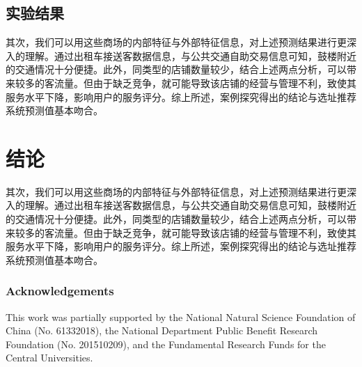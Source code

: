 \documentclass{llncs}
\begin{document}
\subsection{实验结果}
其次，我们可以用这些商场的内部特征与外部特征信息，对上述预测结果进行更深入的理解。通过出租车接送客数据信息，与公共交通自助交易信息可知，鼓楼附近的交通情况十分便捷。此外，同类型的店铺数量较少，结合上述两点分析，可以带来较多的客流量。但由于缺乏竞争，就可能导致该店铺的经营与管理不利，致使其服务水平下降，影响用户的服务评分。综上所述，案例探究得出的结论与选址推荐系统预测值基本吻合。

\section{结论}
其次，我们可以用这些商场的内部特征与外部特征信息，对上述预测结果进行更深入的理解。通过出租车接送客数据信息，与公共交通自助交易信息可知，鼓楼附近的交通情况十分便捷。此外，同类型的店铺数量较少，结合上述两点分析，可以带来较多的客流量。但由于缺乏竞争，就可能导致该店铺的经营与管理不利，致使其服务水平下降，影响用户的服务评分。综上所述，案例探究得出的结论与选址推荐系统预测值基本吻合。

\subsubsection*{Acknowledgements}
This work was partially supported by the National Natural Science Foundation of China (No. 61332018), the National Department Public Benefit Research Foundation (No. 201510209), and the Fundamental Research Funds for the Central Universities.


%

	
\end{document}
